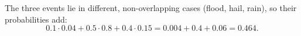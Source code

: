 The three events lie in different, non-overlapping cases (flood, hail, rain), so their probabilities add:
\[0.1\cdot0.04+0.5\cdot0.8+0.4\cdot0.15=0.004+0.4+0.06=\boxed{0.464}.\]
